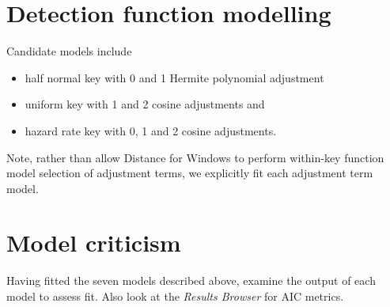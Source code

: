 \documentclass[a4paper]{article}
\begin{document}
\section{Detection function modelling}
Candidate models include 
\begin{itemize}
	\item half normal key with 0 and 1 Hermite polynomial adjustment
	\item uniform key with 1 and 2 cosine adjustments and 
	\item hazard rate key with 0, 1 and 2 cosine adjustments. 
\end{itemize}
 
 Note, rather than allow Distance for Windows to perform within-key function model selection of adjustment terms, we explicitly fit each adjustment term model.

\section{Model criticism}

Having fitted the seven models described above, examine the output of each model to assess fit.  Also look at the \emph{Results Browser} for AIC metrics.

{
}
\end{document}
